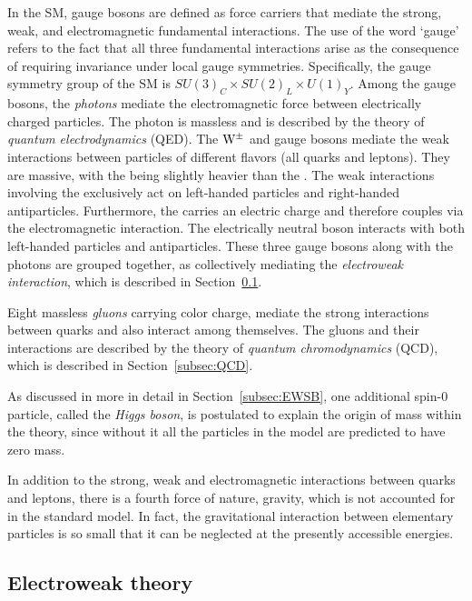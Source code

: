 In the SM, gauge bosons are defined as force carriers that mediate the strong, weak, and electromagnetic fundamental interactions.
The use of the word `gauge' refers to the fact that all three fundamental interactions arise as the consequence of requiring invariance under local gauge symmetries. 
Specifically, the gauge symmetry group of the SM is $SU(3)_C \times SU(2)_L \times U(1)_Y$.
Among the gauge bosons, the \textit{photons} mediate the electromagnetic force between electrically charged particles.
The photon is massless and is described by the theory of \textit{quantum electrodynamics} (QED).
The $\mathrm{W}^{\pm}$ and \PZ gauge bosons mediate the weak interactions between particles of different flavors (all quarks and leptons).
They are massive, with the \PZ being slightly heavier than the \PW.
The weak interactions involving the \PW exclusively act on left-handed particles and right-handed antiparticles.
Furthermore, the \PW carries an electric charge and therefore couples via the electromagnetic interaction.
The electrically neutral \PZ boson interacts with both left-handed particles and antiparticles.
These three gauge bosons along with the photons are grouped together, as collectively mediating the \textit{electroweak interaction}, which is described in Section~\ref{subsec:EWtheory}.

Eight massless \textit{gluons} carrying color charge, mediate the strong interactions between quarks and also interact among themselves.
The gluons and their interactions are described by the theory of \textit{quantum chromodynamics} (QCD), which is described in Section~\ref{subsec:QCD}.

As discussed in more in detail in Section~\ref{subsec:EWSB}, one additional spin-0 particle, called the \textit{Higgs boson}, is postulated to explain the origin of mass within the theory,
since without it all the particles in the model are predicted to have zero mass.

In addition to the strong, weak and electromagnetic interactions between quarks and leptons, there is a fourth force of nature, gravity, which is not accounted for in the standard model.
In fact, the gravitational interaction between elementary particles is so small that it can be neglected at the presently accessible energies.

\subsection{Electroweak theory}\label{subsec:EWtheory}

